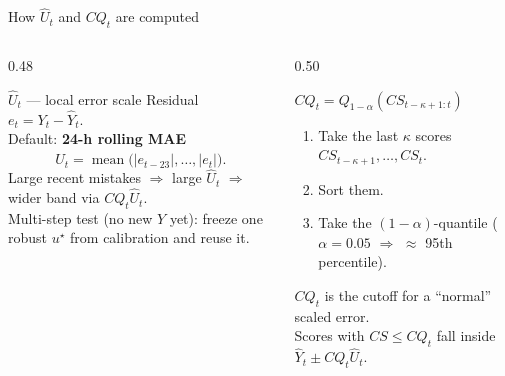 \begin{frame}{How $\widehat U_t$ and $CQ_t$ are computed}
  \begin{columns}[T]
    \begin{column}{0.48\textwidth}
      \begin{block}{$\widehat U_t$ --- local error scale}
        {\footnotesize
        Residual $e_t=Y_t-\widehat Y_t$.\\[0.35em]
        Default: \textbf{24-h rolling MAE}
        \[
          \widehat U_t=
          \operatorname{mean}\big(|e_{t-23}|,\ldots,|e_t|\big).
        \]
        Large recent mistakes $\Rightarrow$ large $\widehat U_t$
        $\Rightarrow$ wider band via $CQ_t\widehat U_t$.\\[0.35em]
        Multi-step test (no new $Y$ yet): freeze one robust
        $u^\star$ from calibration and reuse it.
        }
      \end{block}
    \end{column}
    \begin{column}{0.50\textwidth}
      \begin{block}{$CQ_t=Q_{1-\alpha}(CS_{t-\kappa+1:t})$}
        {\footnotesize
        \begin{enumerate}\setlength\itemsep{0.3em}
          \item Take the last $\kappa$ scores
                $CS_{t-\kappa+1},\ldots,CS_t$.
          \item Sort them.
          \item Take the $(1-\alpha)$-quantile
                ($\alpha{=}0.05$ $\Rightarrow$ $\approx$ 95th percentile).
        \end{enumerate}
        \vspace{0.25em}
        $CQ_t$ is the cutoff for a ``normal'' scaled error.\\
        Scores with $CS\le CQ_t$ fall inside
        $\widehat Y_t\pm CQ_t\widehat U_t$.
        }
      \end{block}
    \end{column}
  \end{columns}
\end{frame}


